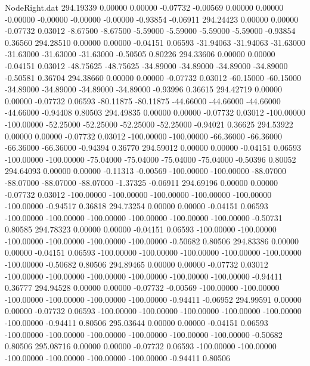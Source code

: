 \begin{filecontents}{NodeRight.dat}
 294.19339    0.00000    0.00000    -0.07732   -0.00569    0.00000    0.00000   -0.00000   -0.00000   -0.00000   -0.00000   -0.93854   -0.06911
 294.24423    0.00000    0.00000    -0.07732    0.03012   -8.67500   -8.67500   -5.59000   -5.59000   -5.59000   -5.59000   -0.93854    0.36560
 294.28510    0.00000    0.00000    -0.04151    0.06593  -31.94063  -31.94063  -31.63000  -31.63000  -31.63000  -31.63000   -0.50505    0.80226
 294.33606    0.00000    0.00000    -0.04151    0.03012  -48.75625  -48.75625  -34.89000  -34.89000  -34.89000  -34.89000   -0.50581    0.36704
 294.38660    0.00000    0.00000    -0.07732    0.03012  -60.15000  -60.15000  -34.89000  -34.89000  -34.89000  -34.89000   -0.93996    0.36615
 294.42719    0.00000    0.00000    -0.07732    0.06593  -80.11875  -80.11875  -44.66000  -44.66000  -44.66000  -44.66000   -0.94408    0.80503
 294.49835    0.00000    0.00000    -0.07732    0.03012 -100.00000 -100.00000  -52.25000  -52.25000  -52.25000  -52.25000   -0.94021    0.36625
 294.53922    0.00000    0.00000    -0.07732    0.03012 -100.00000 -100.00000  -66.36000  -66.36000  -66.36000  -66.36000   -0.94394    0.36770
 294.59012    0.00000    0.00000    -0.04151    0.06593 -100.00000 -100.00000  -75.04000  -75.04000  -75.04000  -75.04000   -0.50396    0.80052
 294.64093    0.00000    0.00000    -0.11313   -0.00569 -100.00000 -100.00000  -88.07000  -88.07000  -88.07000  -88.07000   -1.37325   -0.06911
 294.69196    0.00000    0.00000    -0.07732    0.03012 -100.00000 -100.00000 -100.00000 -100.00000 -100.00000 -100.00000   -0.94517    0.36818
 294.73254    0.00000    0.00000    -0.04151    0.06593 -100.00000 -100.00000 -100.00000 -100.00000 -100.00000 -100.00000   -0.50731    0.80585
 294.78323    0.00000    0.00000    -0.04151    0.06593 -100.00000 -100.00000 -100.00000 -100.00000 -100.00000 -100.00000   -0.50682    0.80506
 294.83386    0.00000    0.00000    -0.04151    0.06593 -100.00000 -100.00000 -100.00000 -100.00000 -100.00000 -100.00000   -0.50682    0.80506
 294.89465    0.00000    0.00000    -0.07732    0.03012 -100.00000 -100.00000 -100.00000 -100.00000 -100.00000 -100.00000   -0.94411    0.36777
 294.94528    0.00000    0.00000    -0.07732   -0.00569 -100.00000 -100.00000 -100.00000 -100.00000 -100.00000 -100.00000   -0.94411   -0.06952
 294.99591    0.00000    0.00000    -0.07732    0.06593 -100.00000 -100.00000 -100.00000 -100.00000 -100.00000 -100.00000   -0.94411    0.80506
 295.03644    0.00000    0.00000    -0.04151    0.06593 -100.00000 -100.00000 -100.00000 -100.00000 -100.00000 -100.00000   -0.50682    0.80506
 295.08716    0.00000    0.00000    -0.07732    0.06593 -100.00000 -100.00000 -100.00000 -100.00000 -100.00000 -100.00000   -0.94411    0.80506

\end{filecontents}
